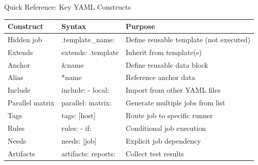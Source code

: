 \documentclass[aspectratio=169]{beamer}
\begin{document}
\begin{frame}[fragile]{Quick Reference: Key YAML Constructs}

\begin{center}
\small
\begin{tabular}{|>{\ttfamily\scriptsize}l|>{\ttfamily\scriptsize}l|p{5.5cm}|}
\hline
\textbf{\textrm{Construct}} & \textbf{\textrm{Syntax}} & \textbf{\textrm{\scriptsize Purpose}} \\
\hline
Hidden job & .template\_name: & Define reusable template (not executed) \\
\hline
Extends & extends: .template & Inherit from template(s) \\
\hline
Anchor & \&name & Define reusable data block \\
\hline
Alias & *name & Reference anchor data \\
\hline
Include & include: - local: & Import from other YAML files \\
\hline
Parallel matrix & parallel: matrix: & Generate multiple jobs from list \\
\hline
Tags & tags: [host] & Route job to specific runner \\
\hline
Rules & rules: - if: & Conditional job execution \\
\hline
Needs & needs: [job] & Explicit job dependency \\
\hline
Artifacts & artifacts: reports: & Collect test results \\
\hline
\end{tabular}
\end{center}

\end{frame}
\end{document}
